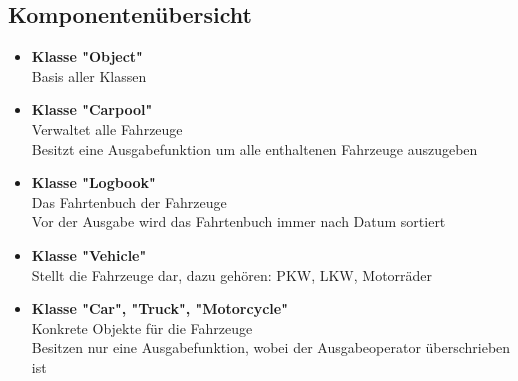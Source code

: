 \subsection{Komponentenübersicht}

\begin{itemize}

\item \textbf{Klasse \string"Object"} \\
Basis aller Klassen

\item \textbf{Klasse "Carpool"}
\\ Verwaltet alle Fahrzeuge
\\ Besitzt eine Ausgabefunktion um alle enthaltenen Fahrzeuge auszugeben

\item \textbf{Klasse "Logbook"}
\\ Das Fahrtenbuch der Fahrzeuge
\\ Vor der Ausgabe wird das Fahrtenbuch immer nach Datum sortiert

\item \textbf{Klasse "Vehicle"}
\\ Stellt die Fahrzeuge dar, dazu gehören: PKW, LKW, Motorräder

\item \textbf{Klasse "Car", "Truck", "Motorcycle"}
\\ Konkrete Objekte für die Fahrzeuge
\\ Besitzen nur eine Ausgabefunktion, wobei der Ausgabeoperator überschrieben ist

\end{itemize}

